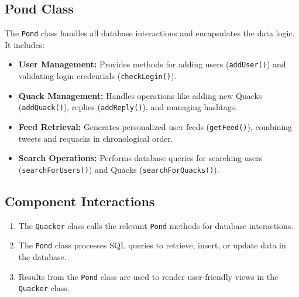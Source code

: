 \documentclass[12pt]{article}
\begin{document}
	\subsection*{Pond Class}
	The \texttt{Pond} class handles all database interactions and encapsulates the data logic. It includes:
	\begin{itemize}
		\item \textbf{User Management:} Provides methods for adding users (\texttt{addUser()}) and validating login credentials (\texttt{checkLogin()}).
		\item \textbf{Quack Management:} Handles operations like adding new Quacks (\texttt{addQuack()}), replies (\texttt{addReply()}), and managing hashtags.
		\item \textbf{Feed Retrieval:} Generates personalized user feeds (\texttt{getFeed()}), combining tweets and requacks in chronological order.
		\item \textbf{Search Operations:} Performs database queries for searching users (\texttt{searchForUsers()}) and Quacks (\texttt{searchForQuacks()}).
	\end{itemize}


	\subsection*{Component Interactions}
	\begin{enumerate}
		\item The \texttt{Quacker} class calls the relevant \texttt{Pond} methods for database interactions.
		\item The \texttt{Pond} class processes SQL queries to retrieve, insert, or update data in the database.
		\item Results from the \texttt{Pond} class are used to render user-friendly views in the \texttt{Quacker} class.
	\end{enumerate}
	
\end{document}
